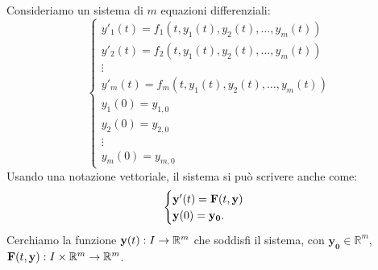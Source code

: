 Consideriamo un sistema di $m$ equazioni differenziali:
\begin{equation*}
\begin{cases}
y'_{1}( t) =f_{1}( t,y_{1}( t) ,y_{2}( t) ,\dotsc ,y_{m}( t))\\
y'_{2}( t) =f_{2}( t,y_{1}( t) ,y_{2}( t) ,\dotsc ,y_{m}( t))\\
\vdots \\
y'_{m}( t) =f_{m}( t,y_{1}( t) ,y_{2}( t) ,\dotsc ,y_{m}( t))\\
y_{1}( 0) =y_{1,0}\\
y_{2}( 0) =y_{2,0}\\
\vdots \\
y_{m}( 0) =y_{m,0}
\end{cases}
\end{equation*}
Usando una notazione vettoriale, il sistema si può scrivere anche come:
\begin{equation*}
\begin{cases}
\mathbf{y} '(t) =\mathbf{F}( t,\mathbf{y})\\
\mathbf{y}(0) =\mathbf{y_{0}}.
\end{cases}
\end{equation*}
Cerchiamo la funzione $\mathbf{y}(t) :I\rightarrow \mathbb{R}^{m}$ che soddisfi il sistema, con $\mathbf{y_{0}} \in \mathbb{R}^{m}$, $\mathbf{F}( t,\mathbf{y}) :I\times \mathbb{R}^{m}\rightarrow \mathbb{R}^{m}$.


